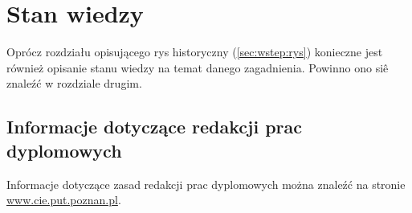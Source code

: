\chapter{Stan wiedzy}
\label{sec:stanwiedzy}

Oprócz rozdziału opisującego rys historyczny (\ref{sec:wstep:rys}) konieczne jest również opisanie stanu wiedzy na temat danego zagadnienia. Powinno ono siê znaleźć w rozdziale drugim.

\section{Informacje dotyczące redakcji prac dyplomowych}
\label{sec:stanwiedzy:redakcja}

Informacje dotyczące zasad redakcji prac dyplomowych można znaleźć na stronie \url{www.cie.put.poznan.pl}.
